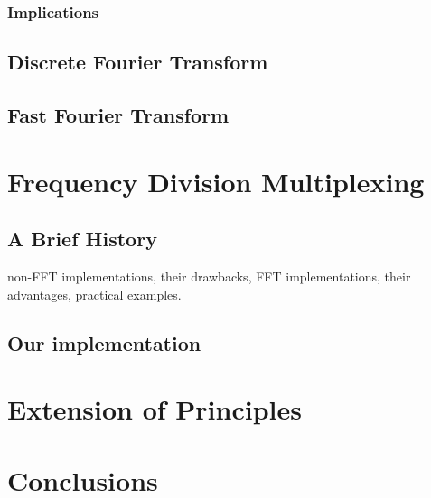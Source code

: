 \documentclass[12pt]{article}
\newcommand{\inftyint}{\int_{-\infty}^{\infty}}
\begin{document}
%
%
%
%

\subsubsection{Implications}

\subsection{Discrete Fourier Transform}

\subsection{Fast Fourier Transform}


\section{Frequency Division Multiplexing}

\subsection{A Brief History}

non-FFT implementations, their drawbacks, FFT implementations, their advantages, practical examples.

\subsection{Our implementation}

\section{Extension of Principles}

\section{Conclusions}
\end{document}
